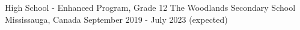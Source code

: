 

\begin{cventries}

  \cventry
    {High School - Enhanced Program, Grade 12} %
    {The Woodlands Secondary School} %
    {Mississauga, Canada} %
    {September 2019 - July 2023 (expected)} %

\end{cventries}
